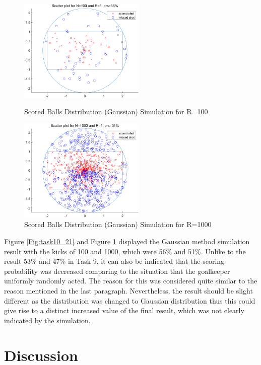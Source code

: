 \documentclass[11pt, a4paper]{article}
\begin{document}
\begin{figure}[htbp]
\centering
\begin{minipage}[t]{0.48\textwidth}
\centering
\includegraphics[width=6cm]{img/t10_21.png}
\caption{Scored Balls Distribution (Gaussian) Simulation for R=100}
\label{Fig:task10_21}
\end{minipage}
\begin{minipage}[t]{0.48\textwidth}
\centering
\includegraphics[width=6cm]{img/t10_22.png}
\caption{Scored Balls Distribution (Gaussian) Simulation for R=1000}
\label{Fig:task10_22}
\end{minipage}
\end{figure}

Figure \ref{Fig:task10_21} and Figure \ref{Fig:task10_22} displayed the Gaussian method simulation result with the kicks of 100 and 1000, which were 56\% and 51\%. Unlike to the result 53\% and 47\% in Task 9, it can also be indicated that the scoring probability was decreased comparing to the situation that the goalkeeper uniformly randomly acted. The reason for this was considered quite similar to the reason mentioned in the last paragraph. Nevertheless, the result should be slight different as the distribution was changed to Gaussian distribution thus this could give rise to a distinct increased value of the final result, which was not clearly indicated by the simulation.


\section{Discussion}
\end{document}
